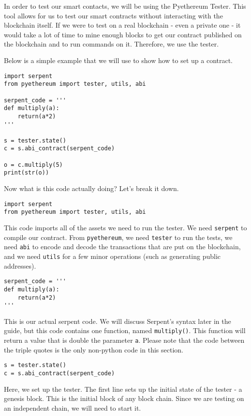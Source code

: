 \documentclass[12pt]{article}
\begin{document}
In order to test our smart contacts, we will be using the Pyethereum Tester. This tool allows for us to test our smart contracts without interacting with the blockchain itself. If we were to test on a real blockchain - even a private one - it would take a lot of time to mine enough blocks to get our contract published on the blockchain and to run commands on it. Therefore, we use the tester.

Below is a simple example that we will use to show how to set up a contract. \cite{test_contracts.py,Usingpyethereum.tester}

\begin{mdframed}
\begin{verbatim}
import serpent
from pyethereum import tester, utils, abi

serpent_code = '''
def multiply(a):
	return(a*2)
'''

s = tester.state()
c = s.abi_contract(serpent_code)

o = c.multiply(5)
print(str(o))
\end{verbatim}
\end{mdframed}

Now what is this code actually doing? Let's break it down.

\begin{verbatim}
import serpent
from pyethereum import tester, utils, abi
\end{verbatim}

This code imports all of the assets we need to run the tester. We need \texttt{serpent} to compile our contract. From \texttt{pyethereum}, we need \texttt{tester} to run the tests, we need \texttt{abi} to encode and decode the transactions that are put on the blockchain, and we need \texttt{utils} for a few minor operations (such as generating public addresses).

\begin{verbatim}
serpent_code = '''
def multiply(a):
	return(a*2)
'''
\end{verbatim}

This is our actual serpent code. We will discuss Serpent's syntax later in the guide, but this code contains one function, named \texttt{multiply()}. This function will return a value that is double the parameter \texttt{a}. Please note that the code between the triple quotes is the only non-python code in this section.

\begin{verbatim}
s = tester.state()
c = s.abi_contract(serpent_code)
\end{verbatim}
Here, we set up the tester. The first line sets up the initial state of the tester - a genesis block. This is the initial block of any block chain. Since we are testing on an independent chain, we will need to start it. 
\end{document}
